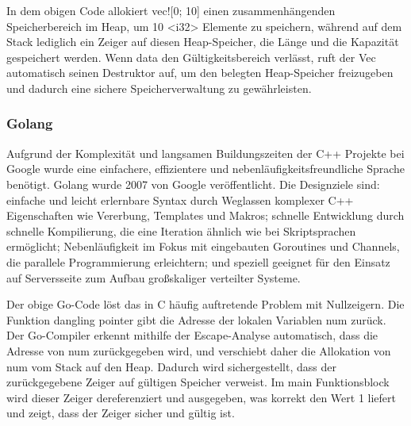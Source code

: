 \begin{figure}[htp]
    \centering
    
    \label{fig:dangling_pointer_in_Rust}
\end{figure}

\begin{figure}[htp]
    \centering
    
    \label{fig:double_free_in_Rust}
\end{figure}

In dem obigen Code allokiert vec![0; 10] einen zusammenhängenden Speicherbereich 
im Heap, um 10 <i32> Elemente zu speichern, während auf dem Stack lediglich ein 
Zeiger auf diesen Heap-Speicher, die Länge und die Kapazität gespeichert werden. 
Wenn data den Gültigkeitsbereich verlässt, ruft der Vec automatisch seinen 
Destruktor auf, um den belegten Heap-Speicher freizugeben und dadurch eine sichere 
Speicherverwaltung zu gewährleisten.

\subsubsection{Golang}
\label{sec:Golang}
Aufgrund der Komplexität und langsamen Buildungszeiten der C++ Projekte bei 
Google wurde eine einfachere, effizientere und nebenläufigkeitsfreundliche Sprache 
benötigt. Golang wurde 2007 von Google veröffentlicht. Die Designziele sind: einfache 
und leicht erlernbare Syntax durch Weglassen komplexer C++ Eigenschaften wie Vererbung, 
Templates und Makros; schnelle Entwicklung durch schnelle Kompilierung, die eine Iteration 
ähnlich wie bei Skriptsprachen ermöglicht; Nebenläufigkeit im Fokus mit eingebauten Goroutines 
und Channels, die parallele Programmierung erleichtern; und speziell geeignet für den Einsatz 
auf Serversseite zum Aufbau großskaliger verteilter Systeme.


\begin{figure}[htp]
    \centering
    
    \label{fig:dangling_pointer_in_Golang}
\end{figure}

Der obige Go-Code löst das in C häufig auftretende Problem mit Nullzeigern. 
Die Funktion dangling pointer gibt die Adresse der lokalen Variablen num zurück. 
Der Go-Compiler erkennt mithilfe der Escape-Analyse automatisch, dass die 
Adresse von num zurückgegeben wird, und verschiebt daher die Allokation 
von num vom Stack auf den Heap. Dadurch wird sichergestellt, dass der 
zurückgegebene Zeiger auf gültigen Speicher verweist. Im main Funktionsblock 
wird dieser Zeiger dereferenziert und ausgegeben, was korrekt den Wert 1 liefert 
und zeigt, dass der Zeiger sicher und gültig ist.
\begin{figure}[htp]
    \centering
    
    \label{fig:double_free_in_Golang}
\end{figure}

